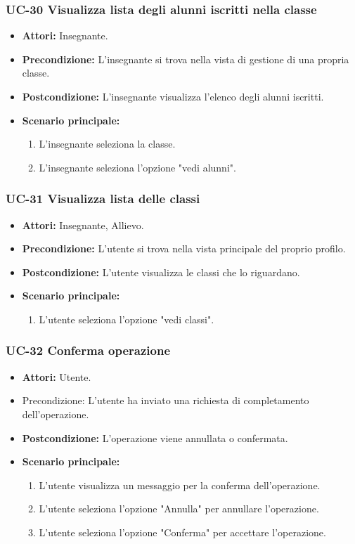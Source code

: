 \subsubsection{UC-30 Visualizza lista degli alunni iscritti nella classe}		
\begin{itemize}
	\item \textbf{Attori:} Insegnante.
	\item \textbf{Precondizione:} L'insegnante si trova nella vista di gestione di una propria classe.
	\item \textbf{Postcondizione:} L'insegnante visualizza l'elenco degli alunni iscritti.
	\item \textbf{Scenario principale:}
	\begin{enumerate}
		\item L'insegnante seleziona la classe.
		\item L'insegnante seleziona l'opzione "vedi alunni".
	\end{enumerate}		
\end{itemize}

\subsubsection{UC-31 Visualizza lista delle classi}		
\begin{itemize}
	\item \textbf{Attori:} Insegnante, Allievo.
	\item \textbf{Precondizione:} L'utente si trova nella vista principale del proprio profilo.
	\item \textbf{Postcondizione:} L'utente visualizza le classi che lo riguardano.
	\item \textbf{Scenario principale:}
	\begin{enumerate}
		\item L'utente seleziona l'opzione "vedi classi".
	\end{enumerate}		
\end{itemize}

\subsubsection{UC-32 Conferma operazione}		
\begin{itemize}
	\item \textbf{Attori:} Utente.
	\item Precondizione: L'utente ha inviato una richiesta di completamento dell'operazione.
	\item \textbf{Postcondizione:} L'operazione viene annullata o confermata.
	\item \textbf{Scenario principale:}
	\begin{enumerate}
		\item L'utente visualizza un messaggio per la conferma dell'operazione.
		\item L'utente seleziona l'opzione "Annulla" per annullare l'operazione.
		\item L'utente seleziona l'opzione "Conferma" per accettare l'operazione.
	\end{enumerate}		
\end{itemize}
